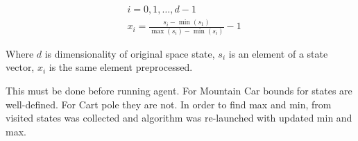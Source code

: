 \documentclass[12pt]{article}
\begin{document}
\begin{equation}
\begin{aligned}
&i={0,1,\ldots, d-1} \\
&x_i = \frac{s_i - \min(s_1)}{\max(s_i) - \min(s_i)} - 1
\end{aligned}
\end{equation}

Where $d$ is dimensionality of original space state, $s_i$ is an element of a state vector, $x_i$ is the same element preprocessed.

This must be done before running agent. For Mountain Car bounds for states are well-defined. For Cart pole they are not. In order to find max and min, from visited states was collected and algorithm was re-launched with updated min and max.

\newpage


 
\end{document}
